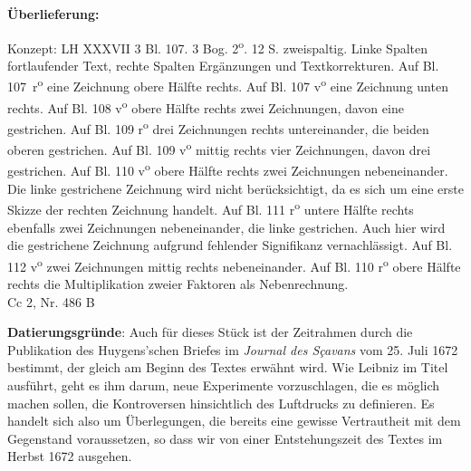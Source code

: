         \begin{ledgroupsized}[r]{120mm}
                \footnotesize 
                \pstart                
                \noindent\textbf{\"{U}berlieferung:}   
                \pend
                \end{ledgroupsized}
                            \begin{ledgroupsized}[r]{114mm}
                            \footnotesize 
                            \pstart \parindent -6mm
                            Konzept: LH XXXVII 3 Bl. 107. 3 Bog. 2\textsuperscript{o}. 12 S. zweispaltig. Linke Spalten fortlaufender Text, rechte Spalten Erg\"{a}nzungen und Textkorrekturen. Auf Bl. 107~r\textsuperscript{o} eine Zeichnung obere H\"{a}lfte rechts. Auf Bl. 107 v\textsuperscript{o} eine Zeichnung unten rechts. Auf Bl. 108 v\textsuperscript{o} obere H\"{a}lfte rechts zwei Zeichnungen, davon eine gestrichen. Auf Bl. 109 r\textsuperscript{o} drei Zeichnungen rechts untereinander, die beiden oberen gestrichen. Auf Bl. 109 v\textsuperscript{o} mittig rechts vier Zeichnungen, davon drei gestrichen. Auf Bl. 110 v\textsuperscript{o} obere H\"{a}lfte rechts zwei Zeichnungen nebeneinander. Die linke gestrichene Zeichnung wird nicht berücksichtigt, da es sich um eine erste Skizze der rechten Zeichnung handelt. Auf Bl. 111 r\textsuperscript{o} untere H\"{a}lfte rechts ebenfalls zwei Zeichnungen nebeneinander, die linke gestrichen. Auch hier wird die gestrichene Zeichnung aufgrund fehlender Signifikanz vernachlässigt. Auf Bl. 112 v\textsuperscript{o} zwei Zeichnungen mittig rechts nebeneinander. Auf Bl. 110 r\textsuperscript{o} obere H\"{a}lfte rechts die Multiplikation zweier Faktoren als Nebenrechnung. 
 \\Cc 2, Nr. 486 B \pend
                            \end{ledgroupsized}
                \vspace*{5mm}
                \begin{ledgroup}
                \footnotesize 
                \pstart
            \noindent\footnotesize{\textbf{Datierungsgr\"{u}nde}: Auch f\"{u}r dieses St\"{u}ck ist der Zeitrahmen durch die Publikation des Huygens'schen Briefes im \cite{00062}\textit{Journal des S\c{c}avans} vom 25. Juli 1672 bestimmt, der gleich am Beginn des Textes erw\"{a}hnt wird. Wie Leibniz im Titel ausf\"{u}hrt, geht es ihm darum, neue Experimente vorzuschlagen, die es m\"{o}glich machen sollen, die Kontroversen hinsichtlich des Luftdrucks zu definieren. Es handelt sich also um \"{U}berlegungen, die bereits eine gewisse Vertrautheit mit dem Gegenstand voraussetzen, so dass wir von einer Entstehungszeit des Textes im Herbst 1672 ausgehen.}
                \pend
                \end{ledgroup}
            
